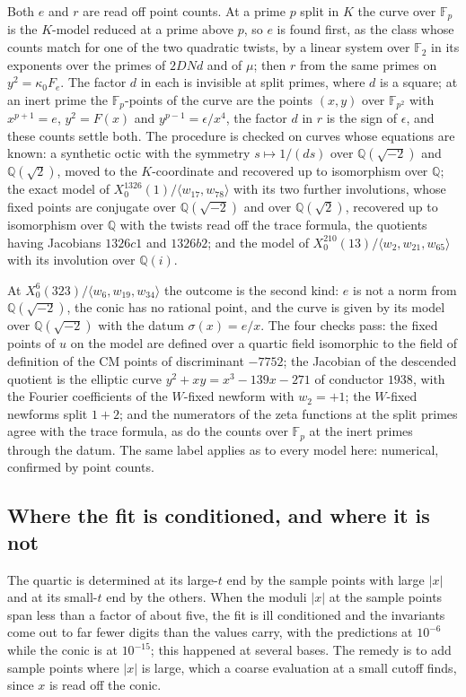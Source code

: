 \documentclass[11pt,reqno]{amsart}
\theoremstyle{plain}
\theoremstyle{definition}
\newcommand{\Q}{\mathbb{Q}}
\newcommand{\F}{\mathbb{F}}
\begin{document}
Both $e$ and $r$ are read off point counts. At a prime $p$ split in $K$ the curve over $\F_p$ is
the $K$-model reduced at a prime above $p$, so $e$ is found first, as the class whose counts match
for one of the two quadratic twists, by a linear system over $\F_2$ in its exponents over the
primes of $2DNd$ and of $\mu$; then $r$ from the same primes on $y^2=\kappa_0F_e$. The factor $d$
in each is invisible at split primes, where $d$ is a square; at an inert prime the $\F_p$-points
of the curve are the points $(x,y)$ over $\F_{p^2}$ with $x^{p+1}=e$, $y^2=F(x)$ and
$y^{p-1}=\epsilon/x^4$, the factor $d$ in $r$ is the sign of $\epsilon$, and these counts settle
both. The procedure is checked on curves whose equations are known: a synthetic octic with the
symmetry $s\mapsto 1/(ds)$ over $\Q(\sqrt{-2})$ and $\Q(\sqrt2)$, moved to the $K$-coordinate and
recovered up to isomorphism over $\Q$; the exact model of $X_0^{1326}(1)/\langle w_{17},w_{78}\rangle$
with its two further involutions, whose fixed points are conjugate over $\Q(\sqrt{-2})$ and over
$\Q(\sqrt2)$, recovered up to isomorphism over $\Q$ with the twists read off the trace formula, the
quotients having Jacobians $1326c1$ and $1326b2$; and the model of
$X_0^{210}(13)/\langle w_2,w_{21},w_{65}\rangle$ with its involution over $\Q(i)$.

At $X_0^{6}(323)/\langle w_6,w_{19},w_{34}\rangle$ the outcome is the second kind: $e$ is not a
norm from $\Q(\sqrt{-2})$, the conic has no rational point, and the curve is given by its model
over $\Q(\sqrt{-2})$ with the datum $\sigma(x)=e/x$. The four checks pass: the fixed points of
$u$ on the model are defined over a quartic field isomorphic to the field of definition of the CM
points of discriminant $-7752$; the Jacobian of the descended quotient is the elliptic curve
$y^2+xy=x^3-139x-271$ of conductor $1938$, with the Fourier coefficients of the $W$-fixed newform
with $w_2=+1$; the $W$-fixed newforms split $1+2$; and the numerators of the zeta functions at the
split primes agree with the trace formula, as do the counts over $\F_p$ at the inert primes through
the datum. The same label applies as to every model here: numerical, confirmed by point counts.

\subsection*{Where the fit is conditioned, and where it is not}
The quartic is determined at its large-$t$ end by the sample points with large $\lvert x\rvert$
and at its small-$t$ end by the others. When the moduli $\lvert x\rvert$ at the sample points span
less than a factor of about five, the fit is ill conditioned and the invariants come out to far
fewer digits than the values carry, with the predictions at $10^{-6}$ while the conic is at
$10^{-15}$; this happened at several bases. The remedy is to add sample points where
$\lvert x\rvert$ is large, which a coarse evaluation at a small cutoff finds, since $x$ is read off
the conic.
\end{document}
